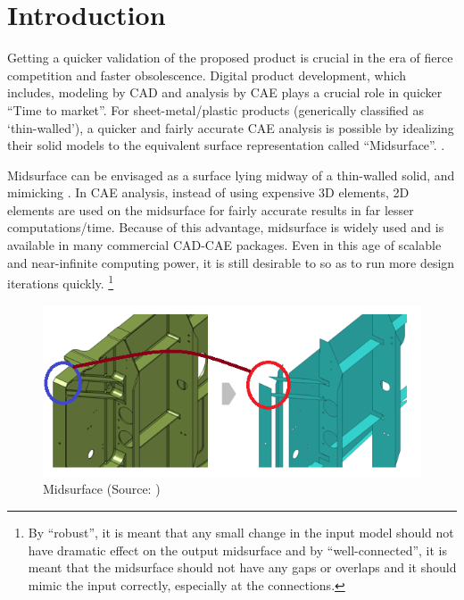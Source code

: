 \section{Introduction}\label{sec:intro}

Getting a quicker validation of the proposed product is crucial in the era of fierce competition and faster obsolescence. Digital product development, which includes, modeling by CAD and analysis by CAE plays a crucial role in quicker ``Time to market''.  For sheet-metal/plastic products (generically classified as `thin-walled'),  a quicker and fairly accurate CAE analysis is possible by idealizing their solid models to the equivalent surface representation called ``Midsurface''. . 

Midsurface can be envisaged as a surface lying midway of a thin-walled solid, and mimicking .   In CAE analysis, instead of using expensive 3D elements, 2D elements are used on the midsurface for fairly accurate results in far lesser computations/time. Because of this  advantage, midsurface is widely used and is available in many commercial CAD-CAE packages.  Even in this age of scalable and near-infinite computing power, it is still desirable to  so as to run more design iterations quickly.  \footnote{By ``robust'', it is meant that any small change in the input model should not have dramatic effect on the output midsurface and by ``well-connected'', it is meant that the midsurface should not have any gaps or overlaps and it should mimic the input correctly, especially at the connections.}

\begin{figure}[!htp]
\centering
\includegraphics[width=0.6\linewidth]{..//Common/images/MidsurfaceErrorsMscApexHighlighted}
\caption{Midsurface  (Source: \cite{MScApex})}
\label{fig:midsurfaceerrors}
\end{figure}

